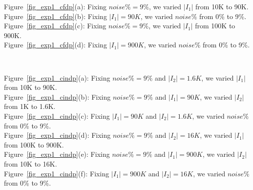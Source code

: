 \begin{figure*}
  \centering
  \quad
  \quad
  \quad
  \caption{Efficiency of detecting \pCFD violations}\label{fig_exp1_cfdp}
\end{figure*}

\noindent Figure~\ref{fig_exp1_cfdp}(a): Fixing $noise\% = 9\%$, we varied $|I_1|$ from 10K to 90K.    \\
Figure~\ref{fig_exp1_cfdp}(b): Fixing $|I_1|=90K$, we varied $noise\%$ from 0\% to 9\%.\\
Figure~\ref{fig_exp1_cfdp}(c): Fixing $noise\% = 9\%$, we varied $|I_1|$ from 100K to 900K.  \\
Figure~\ref{fig_exp1_cfdp}(d): Fixing $|I_1|=900K$, we varied $noise\%$ from 0\% to 9\%.  \\


\begin{figure*}
  \centering
  \quad
  \quad
  \quad \\
  \quad
  \quad
  \caption{Efficiency of detecting \pCIND violations}\label{fig_exp1_cindp}
\end{figure*}

\noindent Figure~\ref{fig_exp1_cindp}(a): Fixing $noise\% = 9\%$ and $|I_2| = 1.6K$, we varied $|I_1|$ from 10K to 90K. \\
Figure~\ref{fig_exp1_cindp}(b): Fixing $noise\% = 9\%$ and $|I_1| = 90K$, we varied $|I_2|$ from 1K to 1.6K.\\
Figure~\ref{fig_exp1_cindp}(c): Fixing $|I_1| = 90K$ and $|I_2| = 1.6K$, we varied $noise\%$ from 0\% to 9\%.\\
Figure~\ref{fig_exp1_cindp}(d): Fixing $noise\% = 9\%$ and $|I_2| = 16K$, we varied $|I_1|$ from 100K to 900K.\\
Figure~\ref{fig_exp1_cindp}(e): Fixing $noise\% = 9\%$ and $|I_1| = 900K$, we varied $|I_2|$ from 10K to 16K.\\
Figure~\ref{fig_exp1_cindp}(f): Fixing $|I_1| = 900K$ and $|I_2| = 16K$, we varied $noise\%$ from 0\% to 9\%.\\


